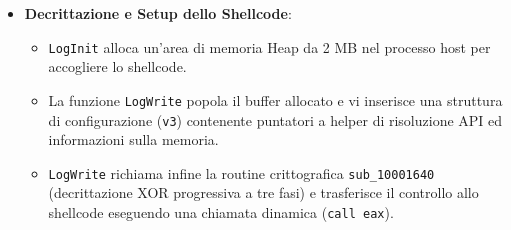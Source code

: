 \begin{itemize}
\begin{itemize}
\begin{enumerate}
      \item Somma all'hash calcolato una chiave statica inizializzata all'avvio a \texttt{535972289} (\texttt{0x1FF09DC1}): $\text{hash\_finale} = h + \text{0x1FF09DC1}$.
    \end{enumerate}
    \item Di seguito sono riportati gli hash decodificati delle API risolte da \texttt{log.dll}:
    \begin{itemize}
      \item \textbf{\texttt{winhttp.dll}}: \texttt{WinHttpOpen} (0x68C6D1D7), \texttt{WinHttpConnect} (0xB26E0E90), \texttt{WinHttpOpenRequest} (0xB22C9C14), \texttt{WinHttpSendRequest} (0x069E8B9B), \texttt{WinHttpReceiveResponse} (0x06AEB5BB), \texttt{WinHttpReadData} (0x28F634E3), \texttt{WinHttpSetStatusCallback} (0x4E6B404E), \texttt{WinHttpSetTimeouts} (0x8E867846).
      \item \textbf{\texttt{kernel32.dll}}: \texttt{VirtualAlloc} (0xBA4AE021), \texttt{VirtualProtect} (0x7DADB766), \texttt{CreateThread} (0xEA8D815C), \texttt{WaitForSingleObject} (0x31854D48), \texttt{LoadLibraryA} (0xE0CDA96B), \texttt{GetProcAddress} (0xB3A0A405).
      \item \textbf{\texttt{wininet.dll}}: \texttt{InternetOpenW} (0x2482E712), \texttt{InternetConnectW} (0x37C94070), \texttt{HttpOpenRequestW} (0xD42E1C6B), \texttt{HttpSendRequestW} (0xAFFE7343), \texttt{InternetReadFile} (0x19CD23D9).
      \item \textbf{\texttt{dnsapi.dll}}: \texttt{DnsQuery\_W} (0x3E77D6C4), \texttt{DnsQuery\_A} (0x00C99B0D), \texttt{DnsFree} (0x297ABAA0).
      \item \textbf{\texttt{ws2\_32.dll}}: \texttt{WSAStartup} (0x098E4D98), \texttt{WSASocketW} (0x1553FF5F), \texttt{connect} (0x9348B408), \texttt{send} (0x20C5BD00), \texttt{recv} (0x10A4DD14), \texttt{closesocket} (0xEA5FEB68).
    \end{itemize}
  \end{itemize}
  \item \textbf{Decrittazione e Setup dello Shellcode}:
  \begin{itemize}
    \item \texttt{LogInit} alloca un'area di memoria Heap da 2 MB nel processo host per accogliere lo shellcode.
    \item La funzione \texttt{LogWrite} popola il buffer allocato e vi inserisce una struttura di configurazione (\texttt{v3}) contenente puntatori a helper di risoluzione API ed informazioni sulla memoria.
    \item \texttt{LogWrite} richiama infine la routine crittografica \texttt{sub\_10001640} (decrittazione XOR progressiva a tre fasi) e trasferisce il controllo allo shellcode eseguendo una chiamata dinamica (\texttt{call eax}).
  \end{itemize}
\end{itemize}


